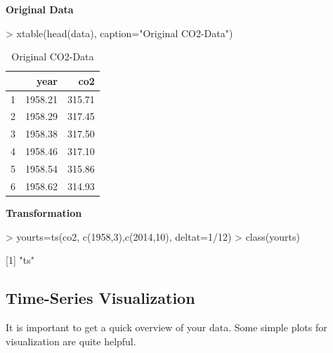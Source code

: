 \documentclass[11pt, a4paper]{article} %
\begin{document}
\noindent \textbf{Original Data}\\
\begin{Schunk}
\begin{Sinput}
> xtable(head(data), caption="Original CO2-Data")
\end{Sinput}
\begin{table}[ht]
\centering
\begin{tabular}{rrr}
  \hline
 & year & co2 \\ 
  \hline
1 & 1958.21 & 315.71 \\ 
  2 & 1958.29 & 317.45 \\ 
  3 & 1958.38 & 317.50 \\ 
  4 & 1958.46 & 317.10 \\ 
  5 & 1958.54 & 315.86 \\ 
  6 & 1958.62 & 314.93 \\ 
   \hline
\end{tabular}
\caption{Original CO2-Data} 
\end{table}\end{Schunk}
\noindent \textbf{Transformation}\\
\begin{Schunk}
\begin{Sinput}
> yourts=ts(co2, c(1958,3),c(2014,10), deltat=1/12)
> class(yourts)
\end{Sinput}
[1] "ts"\end{Schunk}


\subsection{Time-Series Visualization}%
It is important to get a quick overview of your data. Some simple plots for visualization are quite helpful.
\end{document}
